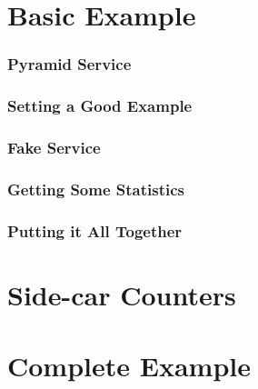 \section{Basic Example}

\begin{frame}
\frametitle{Pyramid Service}
\end{frame}

\begin{frame}
\frametitle{Setting a Good Example}
\end{frame}

\begin{frame}
\frametitle{Fake Service}
\end{frame}

\begin{frame}
\frametitle{Getting Some Statistics}
\end{frame}

\begin{frame}
\frametitle{Putting it All Together}
\end{frame}

\section{Side-car Counters}

\section{Complete Example}


